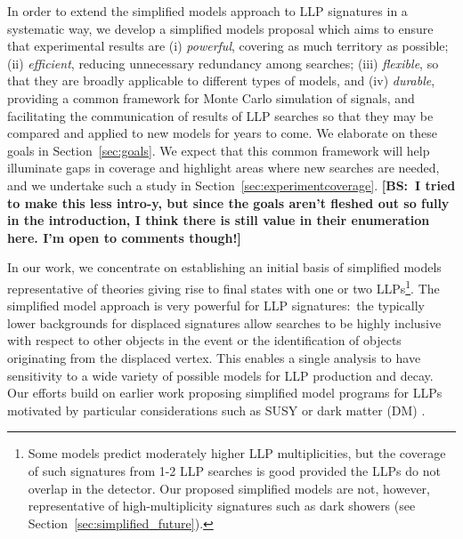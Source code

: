 In order to extend the simplified models approach to LLP signatures in a systematic way, we develop a simplified models proposal which aims to ensure that experimental results are (i) {\em powerful}, covering as much territory as possible; (ii) {\em efficient}, reducing unnecessary redundancy among searches; (iii) {\em flexible}, so that they are broadly applicable to different types of models, and (iv) {\em durable}, providing a common framework for Monte Carlo simulation of signals, and facilitating the communication of results of LLP searches so that they may be compared and applied to new models for years to come. We elaborate on these goals in Section~\ref{sec:goals}.
We expect that this common framework will help illuminate gaps in coverage and highlight areas where new searches are needed, and we undertake such a study in Section~\ref{sec:experimentcoverage}. {\bf [BS:~I tried to make this less intro-y, but since the goals aren't fleshed out so fully in the introduction, I think there is still value in their enumeration here. I'm open to comments though!]}




In our work, we concentrate on establishing an initial basis of simplified models representative of theories giving rise to final states with one or two LLPs\footnote{Some models predict moderately higher LLP multiplicities, but the coverage of such signatures from 1-2 LLP searches is good provided the LLPs do not overlap in the detector. Our proposed simplified models are not, however, representative of high-multiplicity signatures such as dark showers (see Section~\ref{sec:simplified_future}).}.  The simplified model approach is very powerful for LLP signatures:~the typically lower backgrounds for displaced signatures allow searches to be highly inclusive with respect to other objects in the event or the identification of objects originating from the displaced vertex. This enables a single analysis to have sensitivity to a wide variety of possible models for LLP production and decay. Our efforts build on earlier work proposing simplified model programs for LLPs motivated by particular considerations such as SUSY or dark matter (DM) \cite{Heisig:2012zq,Liu:2015bma,Heisig:2015yla,Khoze:2017ixx,Mahbubani:2017gjh,Buchmueller:2017uqu}. 

